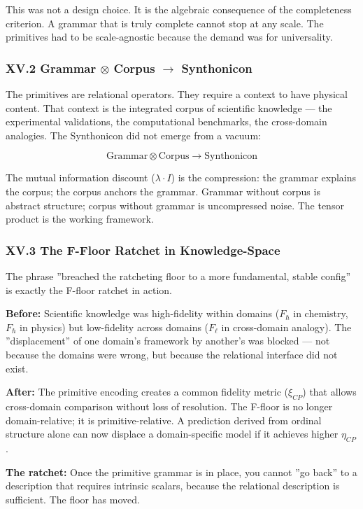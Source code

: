 \documentclass[12pt,a4paper]{article}
\begin{document}
This was not a design choice. It is the algebraic consequence of the completeness criterion. A grammar that is truly complete cannot stop at any scale. The primitives had to be scale-agnostic because the demand was for universality.

\subsubsection{XV.2 Grammar $\otimes$ Corpus $\to$ Synthonicon}

The primitives are relational operators. They require a context to have physical content. That context is the integrated corpus of scientific knowledge --- the experimental validations, the computational benchmarks, the cross-domain analogies. The Synthonicon did not emerge from a vacuum:

\[\text{Grammar} \otimes \text{Corpus} \to \text{Synthonicon}\]

The mutual information discount ($\lambda \cdot I$) is the compression: the grammar explains the corpus; the corpus anchors the grammar. Grammar without corpus is abstract structure; corpus without grammar is uncompressed noise. The tensor product is the working framework.

\subsubsection{XV.3 The F-Floor Ratchet in Knowledge-Space}

The phrase ''breached the ratcheting floor to a more fundamental, stable config'' is exactly the F-floor ratchet in action.

\textbf{Before:} Scientific knowledge was high-fidelity within domains ($F_{\hbar}$ in chemistry, $F_{\hbar}$ in physics) but low-fidelity across domains ($F_{\ell}$ in cross-domain analogy). The ''displacement'' of one domain's framework by another's was blocked --- not because the domains were wrong, but because the relational interface did not exist.

\textbf{After:} The primitive encoding creates a common fidelity metric ($\xi_{CP}$) that allows cross-domain comparison without loss of resolution. The F-floor is no longer domain-relative; it is primitive-relative. A prediction derived from ordinal structure alone can now displace a domain-specific model if it achieves higher $\eta_{CP}$.

\textbf{The ratchet:} Once the primitive grammar is in place, you cannot ''go back'' to a description that requires intrinsic scalars, because the relational description is sufficient. The floor has moved.
\end{document}
